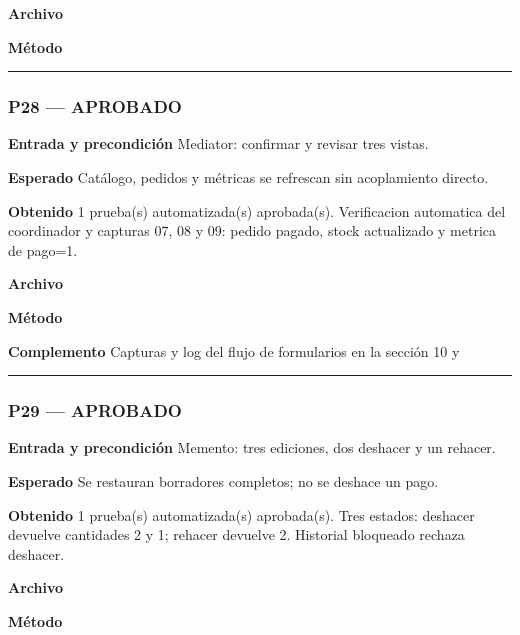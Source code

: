 \textbf{Archivo} \href{https://github.com/Alan77-bot/LogiMarket360Alan/blob/68bda51063441415524ede51bdf61649ee9b4973/tests/LogiMarket.Tests/Patrones/ComportamentalesTests.cs}{}

\textbf{Método} 

\medskip\hrule\medskip
\subsubsection*{P28 --- APROBADO}
\textbf{Entrada y precondición} Mediator: confirmar y revisar tres vistas.

\textbf{Esperado} Catálogo, pedidos y métricas se refrescan sin acoplamiento directo.

\textbf{Obtenido} 1 prueba(s) automatizada(s) aprobada(s). Verificacion automatica del coordinador y capturas 07, 08 y 09: pedido pagado, stock actualizado y metrica de pago=1.

\textbf{Archivo} \href{https://github.com/Alan77-bot/LogiMarket360Alan/blob/68bda51063441415524ede51bdf61649ee9b4973/tests/LogiMarket.Tests/Patrones/MediatorTests.cs}{}

\textbf{Método} 

\textbf{Complemento} Capturas y log del flujo de formularios en la sección 10 y 

\medskip\hrule\medskip
\subsubsection*{P29 --- APROBADO}
\textbf{Entrada y precondición} Memento: tres ediciones, dos deshacer y un rehacer.

\textbf{Esperado} Se restauran borradores completos; no se deshace un pago.

\textbf{Obtenido} 1 prueba(s) automatizada(s) aprobada(s). Tres estados: deshacer devuelve cantidades 2 y 1; rehacer devuelve 2. Historial bloqueado rechaza deshacer.

\textbf{Archivo} \href{https://github.com/Alan77-bot/LogiMarket360Alan/blob/68bda51063441415524ede51bdf61649ee9b4973/tests/LogiMarket.Tests/Patrones/ComportamentalesTests.cs}{}

\textbf{Método} 

